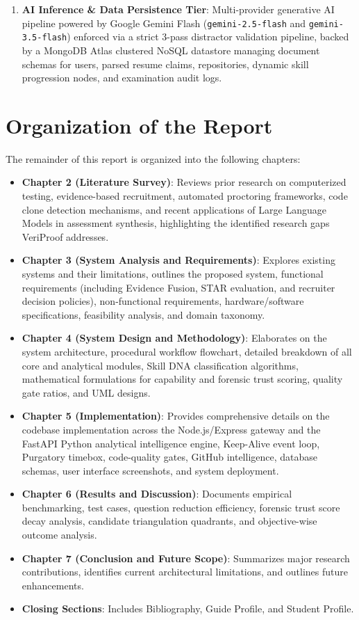 \begin{enumerate}
    \item \textbf{AI Inference \& Data Persistence Tier}:
    Multi-provider generative AI pipeline powered by Google Gemini Flash (\texttt{gemini-2.5-flash} and \texttt{gemini-3.5-flash}) enforced via a strict 3-pass distractor validation pipeline, backed by a MongoDB Atlas clustered NoSQL datastore managing document schemas for users, parsed resume claims, repositories, dynamic skill progression nodes, and examination audit logs.
\end{enumerate}

\section{Organization of the Report}
The remainder of this report is organized into the following chapters:
\begin{itemize}
    \item \textbf{Chapter 2 (Literature Survey)}: Reviews prior research on computerized testing, evidence-based recruitment, automated proctoring frameworks, code clone detection mechanisms, and recent applications of Large Language Models in assessment synthesis, highlighting the identified research gaps VeriProof addresses.
    \item \textbf{Chapter 3 (System Analysis and Requirements)}: Explores existing systems and their limitations, outlines the proposed system, functional requirements (including Evidence Fusion, STAR evaluation, and recruiter decision policies), non-functional requirements, hardware/software specifications, feasibility analysis, and domain taxonomy.
    \item \textbf{Chapter 4 (System Design and Methodology)}: Elaborates on the system architecture, procedural workflow flowchart, detailed breakdown of all core and analytical modules, Skill DNA classification algorithms, mathematical formulations for capability and forensic trust scoring, quality gate ratios, and UML designs.
    \item \textbf{Chapter 5 (Implementation)}: Provides comprehensive details on the codebase implementation across the Node.js/Express gateway and the FastAPI Python analytical intelligence engine, Keep-Alive event loop, Purgatory timebox, code-quality gates, GitHub intelligence, database schemas, user interface screenshots, and system deployment.
    \item \textbf{Chapter 6 (Results and Discussion)}: Documents empirical benchmarking, test cases, question reduction efficiency, forensic trust score decay analysis, candidate triangulation quadrants, and objective-wise outcome analysis.
    \item \textbf{Chapter 7 (Conclusion and Future Scope)}: Summarizes major research contributions, identifies current architectural limitations, and outlines future enhancements.
    \item \textbf{Closing Sections}: Includes Bibliography, Guide Profile, and Student Profile.
\end{itemize}
\clearpage

